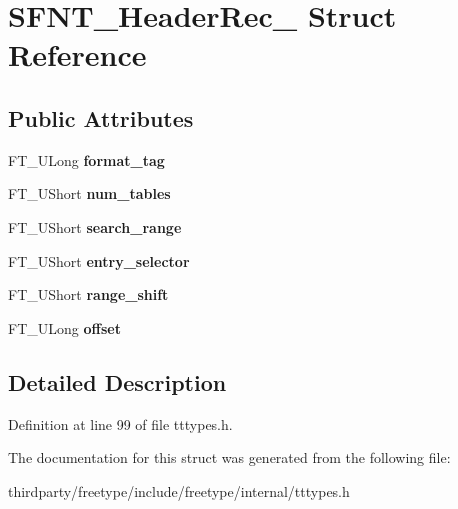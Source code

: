 \hypertarget{struct_s_f_n_t___header_rec__}{}\section{S\+F\+N\+T\+\_\+\+Header\+Rec\+\_\+ Struct Reference}
\label{struct_s_f_n_t___header_rec__}
\subsection*{Public Attributes}
\begin{DoxyCompactItemize}
\item 
\mbox{\label{struct_s_f_n_t___header_rec___ad59d649b189ab19fae02341e95e02448}} 
F\+T\+\_\+\+U\+Long {\bfseries format\+\_\+tag}
\item 
\mbox{\label{struct_s_f_n_t___header_rec___a46d8d8bf8f2d8b6536eb5fa5704852e2}} 
F\+T\+\_\+\+U\+Short {\bfseries num\+\_\+tables}
\item 
\mbox{\label{struct_s_f_n_t___header_rec___a39ca0e21eaec6be602547bb2ed898d5d}} 
F\+T\+\_\+\+U\+Short {\bfseries search\+\_\+range}
\item 
\mbox{\label{struct_s_f_n_t___header_rec___ada628a85486eb034abd56b872ecdcd78}} 
F\+T\+\_\+\+U\+Short {\bfseries entry\+\_\+selector}
\item 
\mbox{\label{struct_s_f_n_t___header_rec___aa2a39db194a8a9a0cc8504143ac4f5c1}} 
F\+T\+\_\+\+U\+Short {\bfseries range\+\_\+shift}
\item 
\mbox{\label{struct_s_f_n_t___header_rec___a04f99ce2ff335f8702a4edf7132a3e04}} 
F\+T\+\_\+\+U\+Long {\bfseries offset}
\end{DoxyCompactItemize}


\subsection{Detailed Description}


Definition at line 99 of file tttypes.\+h.



The documentation for this struct was generated from the following file\+:\begin{DoxyCompactItemize}
\item 
thirdparty/freetype/include/freetype/internal/tttypes.\+h\end{DoxyCompactItemize}
